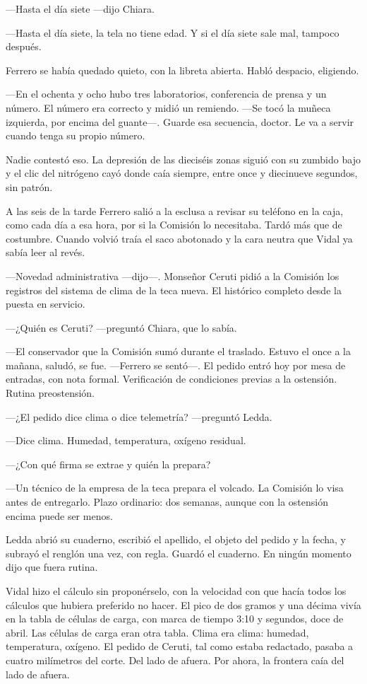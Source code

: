 ---Hasta el día siete ---dijo Chiara.

---Hasta el día siete, la tela no tiene edad. Y si el día siete sale mal, tampoco después.

Ferrero se había quedado quieto, con la libreta abierta. Habló despacio, eligiendo.

---En el ochenta y ocho hubo tres laboratorios, conferencia de prensa y un número. El número era correcto y midió un remiendo. ---Se tocó la muñeca izquierda, por encima del guante---. Guarde esa secuencia, doctor. Le va a servir cuando tenga su propio número.

Nadie contestó eso. La depresión de las dieciséis zonas siguió con su zumbido bajo y el clic del nitrógeno cayó donde caía siempre, entre once y diecinueve segundos, sin patrón.

A las seis de la tarde Ferrero salió a la esclusa a revisar su teléfono en la caja, como cada día a esa hora, por si la Comisión lo necesitaba. Tardó más que de costumbre. Cuando volvió traía el saco abotonado y la cara neutra que Vidal ya sabía leer al revés.

---Novedad administrativa ---dijo---. Monseñor Ceruti pidió a la Comisión los registros del sistema de clima de la teca nueva. El histórico completo desde la puesta en servicio.

---¿Quién es Ceruti? ---preguntó Chiara, que lo sabía.

---El conservador que la Comisión sumó durante el traslado. Estuvo el once a la mañana, saludó, se fue. ---Ferrero se sentó---. El pedido entró hoy por mesa de entradas, con nota formal. Verificación de condiciones previas a la ostensión. Rutina preostensión.

---¿El pedido dice clima o dice telemetría? ---preguntó Ledda.

---Dice clima. Humedad, temperatura, oxígeno residual.

---¿Con qué firma se extrae y quién la prepara?

---Un técnico de la empresa de la teca prepara el volcado. La Comisión lo visa antes de entregarlo. Plazo ordinario: dos semanas, aunque con la ostensión encima puede ser menos.

Ledda abrió su cuaderno, escribió el apellido, el objeto del pedido y la fecha, y subrayó el renglón una vez, con regla. Guardó el cuaderno. En ningún momento dijo que fuera rutina.

Vidal hizo el cálculo sin proponérselo, con la velocidad con que hacía todos los cálculos que hubiera preferido no hacer. El pico de dos gramos y una décima vivía en la tabla de células de carga, con marca de tiempo 3:10 y segundos, doce de abril. Las células de carga eran otra tabla. Clima era clima: humedad, temperatura, oxígeno. El pedido de Ceruti, tal como estaba redactado, pasaba a cuatro milímetros del corte. Del lado de afuera. Por ahora, la frontera caía del lado de afuera.

